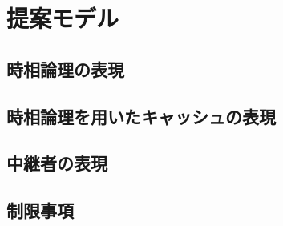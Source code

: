 \documentclass[12pt,a4paper]{jbook}
\begin{document}
\chapter{提案モデル}
\section{時相論理の表現}
\section{時相論理を用いたキャッシュの表現}
\section{中継者の表現}
\section{制限事項}
\end{document}
